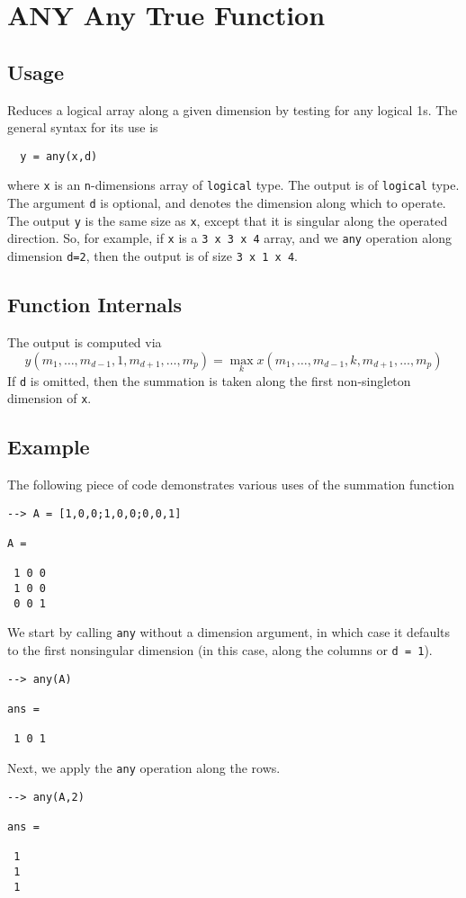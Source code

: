 \section{ANY Any True Function}

\subsection{Usage}

Reduces a logical array along a given dimension by testing for any
logical 1s.  The general 
syntax for its use is
\begin{verbatim}
  y = any(x,d)
\end{verbatim}
where \verb|x| is an \verb|n|-dimensions array of \verb|logical| type.
The output is of \verb|logical| type.  The argument \verb|d| is 
optional, and denotes the dimension along which to operate.
The output \verb|y| is the same size as \verb|x|, except that it is 
singular along the operated direction.  So, for example,
if \verb|x| is a \verb|3 x 3 x 4| array, and we \verb|any| operation along
dimension \verb|d=2|, then the output is of size \verb|3 x 1 x 4|.
\subsection{Function Internals}

The output is computed via
\[
y(m_1,\ldots,m_{d-1},1,m_{d+1},\ldots,m_{p}) = 
\max_{k} x(m_1,\ldots,m_{d-1},k,m_{d+1},\ldots,m_{p})
\]
If \verb|d| is omitted, then the summation is taken along the 
first non-singleton dimension of \verb|x|. 
\subsection{Example}

The following piece of code demonstrates various uses of the summation
function
\begin{verbatim}
--> A = [1,0,0;1,0,0;0,0,1]

A = 

 1 0 0 
 1 0 0 
 0 0 1 
\end{verbatim}
We start by calling \verb|any| without a dimension argument, in which 
case it defaults to the first nonsingular dimension (in this case, 
along the columns or \verb|d = 1|).
\begin{verbatim}
--> any(A)

ans = 

 1 0 1 
\end{verbatim}
Next, we apply the \verb|any| operation along the rows.
\begin{verbatim}
--> any(A,2)

ans = 

 1 
 1 
 1 
\end{verbatim}
